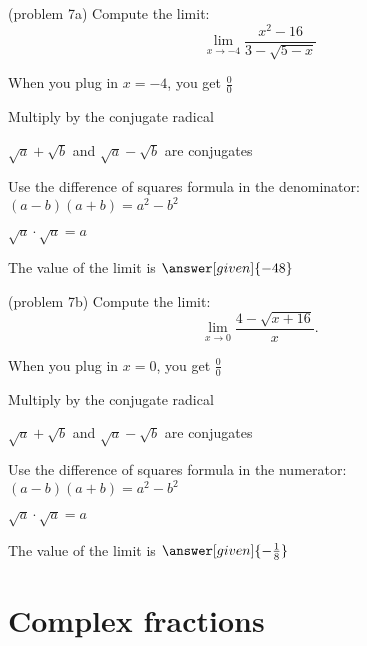 \documentclass{ximera}
\begin{document}
		
\begin{problem}(problem 7a)
  Compute the limit:
  \[
  \lim_{x \to -4} \frac{x^2 - 16}{3 - \sqrt{5 -x}}
  \]
  
    \begin{hint}
      When you plug in $x = -4$, you get $\frac00$
    \end{hint}
    \begin{hint}
      Multiply by the conjugate radical
    \end{hint}
    \begin{hint}
      $\sqrt a + \sqrt b$ and $\sqrt a - \sqrt b$ are conjugates
    \end{hint}
    \begin{hint}
      Use the difference of squares formula in the denominator: $(a-b)(a+b) = a^2 - b^2$
    \end{hint}
    \begin{hint}
      $\sqrt a \cdot \sqrt a = a$
    \end{hint}
		The value of the limit is
		 $\answer[given]{-48}$
		
\end{problem}



\begin{problem}(problem 7b)
  Compute the limit:
  \[
  \lim_{x \to 0} \frac{4- \sqrt{x + 16}}{x}.
  \]
  
    \begin{hint}
      When you plug in $x = 0$, you get $\frac00$
    \end{hint}
    \begin{hint}
      Multiply by the conjugate radical
    \end{hint}
    \begin{hint}
      $\sqrt a + \sqrt b$ and $\sqrt a - \sqrt b$ are conjugates
    \end{hint}
    \begin{hint}
      Use the difference of squares formula in the numerator: $(a-b)(a+b) = a^2 - b^2$
    \end{hint}
    \begin{hint}
      $\sqrt a \cdot \sqrt a = a$ 
    \end{hint}
		The value of the limit is
		 $\answer[given]{-\frac18}$
		
\end{problem}

\section{Complex fractions}
\end{document}
